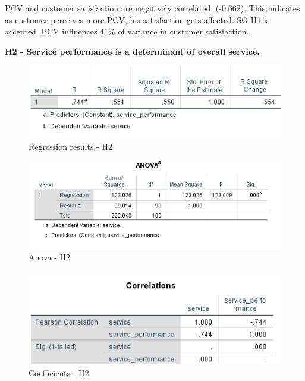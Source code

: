 \documentclass[a4paper, 12pt]{extarticle}
\begin{document}
{PCV and customer satisfaction are negatively correlated. (-0.662). This indicates as customer perceives more PCV, his satisfaction gets affected. SO H1 is accepted.
PCV influences 41\% of variance in customer satisfaction.\\
\newpage
\par \textbf{H2 - Service performance is a determinant of overall service.}\\
\begin{figure}[H]
\centering
\includegraphics[scale=1]{service_performance_vs_service.png}
\caption{Regression results - H2}
\end{figure}


\begin{figure}[H]
\centering
\includegraphics[scale=1]{anova_s_sp.png}
\caption{Anova - H2}
\end{figure}

\begin{figure}[H]
\centering
\includegraphics[scale=1]{h2.png}
\caption{Coefficients - H2}
\end{figure}

}
\end{document}
